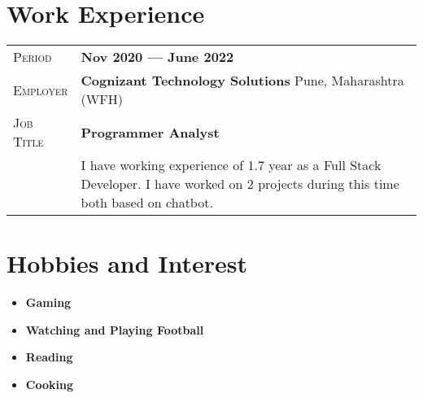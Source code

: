 \documentclass[a4paper]{scrartcl} %
\newcommand{\gray}{\rowcolor[gray]{.90}} %
\begin{document}
\begin{center}
		
		
		\section{Work Experience}
		
		\vspace{12pt}
		
		\begin{tabularx}{0.97\linewidth}{>{\raggedleft\scshape}p{2cm}X}
			\gray Period & \textbf{Nov 2020 --- June 2022 }\\
			\gray Employer & \textbf{Cognizant Technology Solutions} \hfill Pune, Maharashtra (WFH)\\
			\gray Job Title & \textbf{Programmer Analyst}\\
			& I have working experience of 1.7 year as a Full Stack Developer. I have 
			worked on 2 projects during this time both based on chatbot.
		\end{tabularx}
		
		\section{Hobbies and Interest}
		
		\begin{itemize}
			\setlength\itemsep{0em}
			
			\item \noindent \textbf{Gaming}
			\item \noindent \textbf{Watching and Playing Football}
			\item \noindent\textbf{Reading}
			\item \noindent\textbf{Cooking} \\
		\end{itemize}
		
		
		
	\end{center}
	
\end{document}

